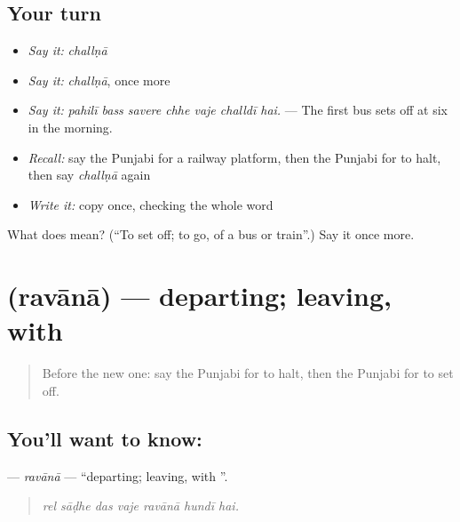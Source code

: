 \subsection*{Your turn}
\begin{itemize}
\raggedright
  \item \emph{Say it:} \emph{challṇā}
  \item \emph{Say it:} \emph{challṇā}, once more
  \item \emph{Say it:} \emph{pahilī bass savere chhe vaje challdī hai.} — The first bus sets off at six in the morning.
  \item \emph{Recall:} say the Punjabi for a railway platform, then the Punjabi for to halt, then say \emph{challṇā} again
  \item \emph{Write it:} copy \textbf{} once, checking the whole word
\end{itemize}

\begin{tcolorbox}[breakable,colback=teal!4,colframe=teal!35!black,title={Before you move on}]
What does  mean? (\textquotedblleft{}To set off; to go, of a bus or train\textquotedblright{}.) Say it once more.
\end{tcolorbox}
\section[\texorpdfstring{\pa{ਰਵਾਨਾ} (ravānā)}{ਰਵਾਨਾ (ravānā)}]{ (ravānā) — departing; leaving, with }

\label{lesson:PA-C261-ravana}



\begin{quote}
Before the new one: say the Punjabi for to halt, then the Punjabi for to set off.
\end{quote}

\subsection*{You'll want to know: }
\textbf{} — \emph{ravānā} — \textquotedblleft{}departing; leaving, with \textquotedblright{}.

\begin{quote}
      
\end{quote}

\begin{quote}
\emph{rel sāḍhe das vaje ravānā hundī hai.}
\end{quote}

